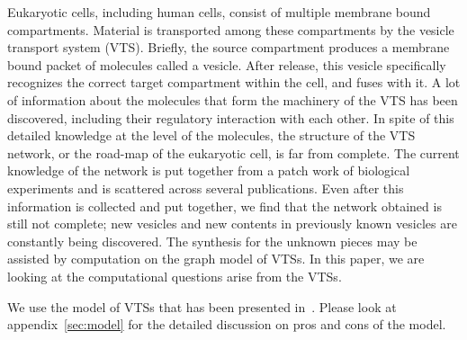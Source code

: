 

Eukaryotic cells, including human cells, consist of multiple membrane
bound compartments.
%
Material is transported among these compartments by the vesicle
transport system (VTS).
%
Briefly, the source compartment produces a membrane bound packet of
molecules called a vesicle.
%
After release, this vesicle specifically recognizes the correct target
compartment within the cell, and fuses with it.
%
A lot of information about the molecules that form the machinery of
the VTS has been discovered, including their regulatory interaction
with each other. 
%
In spite of this detailed knowledge at the level of the molecules, the
structure of the VTS network, or the road-map of the eukaryotic cell,
is far from complete.
%
The current knowledge of the network is put together from a patch work
of biological experiments and is scattered across several publications.
%
Even after this information is collected and put together, we find
that the network obtained is still not complete; new vesicles and new
contents in previously known vesicles are constantly being discovered.
%
The synthesis for the unknown pieces may be assisted by computation on
the graph model of VTSs.
%
% 
%
%
%
%
%
In this paper, we are looking at the computational questions 
arise from the VTSs.


We use the model of VTSs that has been presented in~\cite{VTS}.
%
Please look at appendix~\ref{sec:model}
for the detailed discussion on pros and cons of the model.



